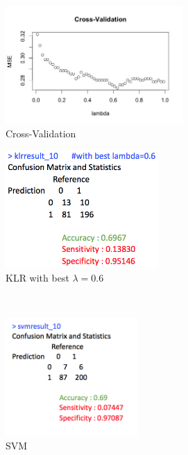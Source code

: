 \documentclass[11pt, oneside]{article}   	%
\begin{document}
\begin{figure}[h]
        \centering
        \begin{subfigure}[b]{0.475\textwidth}
            \centering
            \includegraphics[width=\textwidth, height=4.5cm]{lambda_10}
            \caption{\small Cross-Validation}\label{lambda_10}
        \end{subfigure}
        \hfill
        \begin{subfigure}[b]{0.475\textwidth}
            \centering
            \includegraphics[width=\textwidth, height=4.5cm]{klr_10_best}
            \caption{\small KLR with best $\lambda=0.6$}\label{klr_10_best}
        \end{subfigure} \\ \hfil \hspace{1em}
        \centering
        \begin{subfigure}[b]{0.475\textwidth}
            \centering
            \includegraphics[width=\textwidth, height=4.5cm]{svm_10}
            \caption{\small SVM }\label{svm_10}
        \end{subfigure}
        \hfil
        \begin{subfigure}[b]{0.475\textwidth}

\end{subfigure}
\end{figure}
\end{document}
